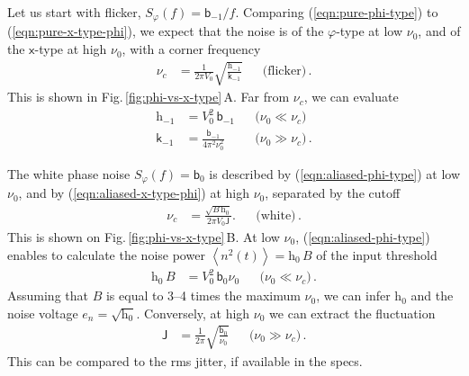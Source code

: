 \documentclass{article}
\newcommand{\req}[1]{(\ref{#1})}
\begin{document}
Let us start with flicker, $S_\varphi(f)=\mathsf{b}_{-1}/f$.  Comparing \req{eqn:pure-phi-type} to \req{eqn:pure-x-type-phi}, we expect that the noise is of the $\varphi$-type at low $\nu_0$, and of the $\mathsf{x}$-type at high $\nu_0$, with a corner frequency 
\begin{align}
\nu_c&=\frac{1}{2\pi V_0}\sqrt{\frac{\mathrm{h}_{-1}}{\mathsf{k}_{-1}}}
&&\text{(flicker)}\,.
\label{eqn:thresh-flicker}
\end{align}
This is shown in Fig.\,\ref{fig:phi-vs-x-type}\,A\@.
Far from $\nu_c$, we can evaluate
\begin{align}
\mathrm{h}_{-1}&=V_0^2\,\mathsf{b}_{-1}
&&\text{($\nu_0\ll\nu_c$)}\\[1ex]
\mathsf{k}_{-1}&=\frac{\mathsf{b}_{-1}}{4\pi^2\nu_0^2}
&&\text{($\nu_0\gg\nu_c$)}\,.
\end{align}

The white phase noise $S_\varphi(f)=\mathsf{b}_0$ is described by \req{eqn:aliased-phi-type} at low $\nu_0$, and by \req{eqn:aliased-x-type-phi} at high $\nu_0$, separated by the cutoff
\begin{align}
\nu_c&=\frac{\sqrt{B\,\mathrm{h}_0}}{2\pi V_0\mathsf{J}}.
&&\text{(white)}\,.
\label{eqn:thresh-white}
\end{align}
This is shown on Fig.\,\ref{fig:phi-vs-x-type}\,B\@.
At low $\nu_0$, \req{eqn:aliased-phi-type} enables to calculate the noise power $\left<n^2(t)\right>=\mathrm{h}_{0}\,B$ of the input threshold
\begin{align}
\mathrm{h}_{0}\,B&=V_0^2\,\mathsf{b}_0\nu_0
&&\text{($\nu_0\ll\nu_c$)}\,.
\end{align}
Assuming that $B$ is equal to 3--4 times the maximum $\nu_0$, we can infer $\mathrm{h}_{0}$ and the noise voltage $e_n=\sqrt{\mathrm{h}_{0}}$.
Conversely, at high $\nu_0$ we can extract the fluctuation
\begin{align}
\mathsf{J}&=\frac{1}{2\pi}\sqrt{\frac{\mathsf{b}_0}{\nu_0}}
&&\text{($\nu_0\gg\nu_c$)}\,.
\end{align}
This can be compared to the rms jitter, if available in the specs.



\end{document}
